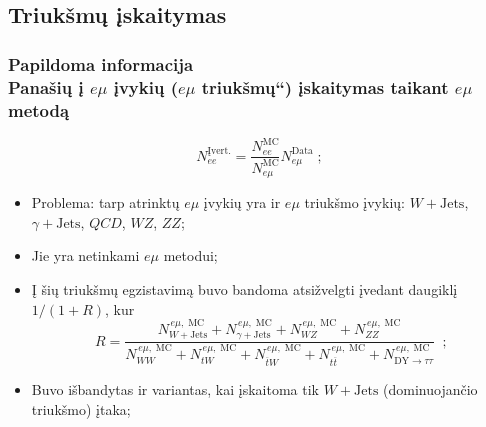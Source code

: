 \documentclass[xcolor=dvipsnames]{beamer}
\newcommand{\ltq}[1]{{\quotedblbase{}#1\textquotedblleft{}}}
\newcommand{\WJets}{\mathit{W}+\mathrm{Jets}}
\newcommand{\emu}{\mathit{e}\mu}
\newcommand{\WW}{\mathit{WW}}
\newcommand{\ZZ}{\mathit{ZZ}}
\newcommand{\WZ}{\mathit{WZ}}
\newcommand{\gJets}{\gamma\! +\!\mathrm{Jets}}
\newcommand{\DYtau}{\mathrm{DY} \! \rightarrow \! \tau\tau}
\newcommand{\QCD}{\mathit{QCD}}
\newcommand{\ttbar}{\mathit{t}\overline{\mathit{t}}}
\newcommand{\tbarW}{\overline{\mathit{t}}\mathit{W}}
\newcommand{\tW}{\mathit{tW}}
\begin{document}
\begin{frame}
\subsection{Triukšmų įskaitymas}
\frametitle{Papildoma informacija\\ \small Panašių į $\emu$ įvykių (\ltq{$\emu$ triukšmų}) įskaitymas taikant $\emu$ metodą}
\begin{equation*}
\mathit{N_{ee}^{\mathrm{Įvert.}}}=\frac{\mathit{N_{ee}^{\mathrm{MC}}}}{\mathit{N_{e\mu}^{\mathrm{MC}}}}\mathit{N_{e\mu}^{\mathrm{Data}}} \; ;
\end{equation*}
\begin{itemize}
\item Problema: tarp atrinktų $\emu$ įvykių yra ir $\emu$ triukšmo įvykių: $\WJets$, $\gJets$, $\QCD$, $\WZ$, $\ZZ$;
\item Jie yra netinkami $\emu$ metodui;
\item Į šių triukšmų egzistavimą buvo bandoma atsižvelgti įvedant daugiklį $1/(1+\mathit{R})$, kur
\begin{equation*}
\mathit{R}=\frac{
\mathit{N}_{\WJets}^{\, \emu , \; \mathrm{MC}}+
\mathit{N}_{\gJets}^{\, \emu , \; \mathrm{MC}}+
\mathit{N}_{\WZ}^{\, \emu , \; \mathrm{MC}}+
\mathit{N}_{\ZZ}^{\, \emu , \; \mathrm{MC}}
}{
\mathit{N}_{\WW}^{\, \emu , \; \mathrm{MC}}+
\mathit{N}_{\tW}^{\, \emu , \; \mathrm{MC}}+
\mathit{N}_{\tbarW}^{\, \emu , \; \mathrm{MC}}+
\mathit{N}_{\ttbar}^{\, \emu , \; \mathrm{MC}}+
\mathit{N}_{\DYtau}^{\, \emu , \; \mathrm{MC}}
} \;\; ;
\end{equation*}
\item Buvo išbandytas ir variantas, kai įskaitoma tik $\WJets$ (dominuojančio triukšmo) įtaka;
\end{itemize}
\end{frame}
\end{document}
